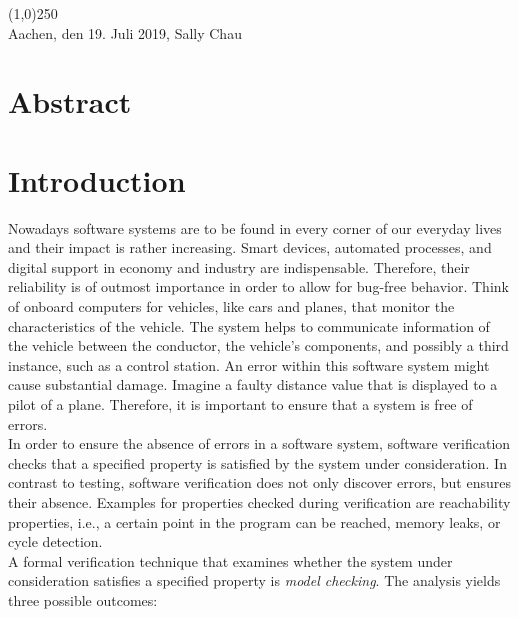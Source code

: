 \documentclass[a4paper, 12pt, twoside]{report}
\begin{document}
	\noindent\line(1,0){250}\\
	Aachen, den 19. Juli 2019, Sally Chau
	
	\clearpage\mbox{}\clearpage
	
	\chapter*{Abstract}
	
	\clearpage\mbox{}\clearpage
	
	\doublespacing
	\tableofcontents
	\singlespacing
	\clearpage\mbox{}\clearpage
	\thispagestyle{empty} 
	
	\pagestyle{fancy}
	\fancyhead[RE]{\nouppercase\leftmark}
	\fancyhead[LO]{\nouppercase\rightmark}
	\fancyhead[LE,RO]{\thepage}
	\cfoot{}
	
	
	\chapter{Introduction}\label{chp:intro}
	
	Nowadays software systems are to be found in every corner of our everyday lives and their impact is rather increasing. Smart devices, automated processes, and digital support in economy and industry are indispensable. Therefore, their reliability is of outmost importance in order to allow for bug-free behavior. Think of onboard computers for vehicles, like cars and planes, that monitor the characteristics of the vehicle. The system helps to communicate information of the vehicle between the conductor, the vehicle's components, and possibly a third instance, such as a control station. An error within this software system might cause substantial damage. Imagine a faulty distance value that is displayed to a pilot of a plane. Therefore, it is important to ensure that a system is free of errors. \\
	
	In order to ensure the absence of errors in a software system, software verification checks that a specified property is satisfied by the system under consideration. In contrast to testing, software verification does not only discover errors, but ensures their absence. Examples for properties checked during verification are reachability properties, i.e., a certain point in the program can be reached, memory leaks, or cycle detection.\\
	
	A formal verification technique that examines whether the system under consideration satisfies a specified property is \textit{model checking}. The analysis yields three possible outcomes:
	
\end{document}
